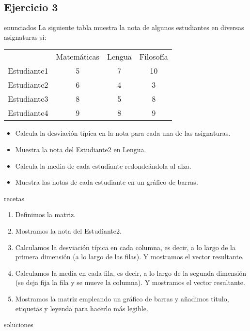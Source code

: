 \subsection{Ejercicio 3}
\def\parte{enunciados}
\ifx\capitulo\parte
La siguiente tabla muestra la nota de algunos estudiantes en diversas asignaturas sí:

\begin{center}
  \begin{tabular}[h]{cccc}
    &Matemáticas&Lengua&Filosofía \\
    Estudiante1&5&7&10 \\
    Estudiante2&6&4&3 \\
    Estudiante3&8&5&8 \\
    Estudiante4&9&8&9 
  \end{tabular}
\end{center}

\begin{itemize}
\item Calcula la desviación típica en la nota para cada una de las asignaturas.
\item Muestra la nota del Estudiante2 en Lengua.
\item Calcula la media de cada estudiante redondeándola al alza.
\item Muestra las notas de cada estudiante en un gráfico de barras.
\end{itemize}
\fi

\def\parte{recetas}
\ifx\capitulo\parte
\begin{enumerate}
\item Definimos la matriz.
\item Mostramos la nota del Estudiante2.
\item Calculamos la desviación típica en cada columna, es decir, a lo largo de la primera dimensión (a lo largo de las filas). Y mostramos el vector resultante.
\item Calculamos la media en cada fila, es decir, a lo largo de la segunda dimensión (se deja fija la fila y se mueve la columna). Y mostramos el vector resultante.
\item Mostramos la matriz empleando un gráfico de barras y añadimos título, etiquetas y leyenda para hacerlo más legible.
\end{enumerate}
\fi

\def\parte{soluciones}
\ifx\capitulo\parte

\fi
